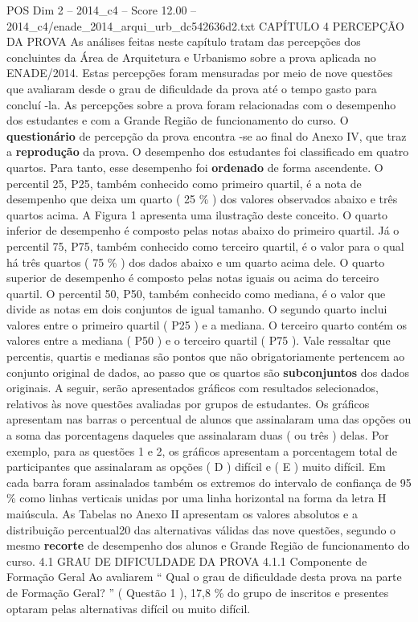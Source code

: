 \begin{textsample}{POS Dim 2 – 2014\_c4 – Score 12.00 – 2014\_c4/enade\_2014\_arqui\_urb\_dc542636d2.txt}  \label{ex:f2_pos_117}
CAPÍTULO 4 PERCEPÇÃO DA PROVA As análises feitas neste capítulo tratam das percepções dos concluintes da Área de Arquitetura e Urbanismo sobre a prova aplicada no ENADE/2014.
Estas percepções foram mensuradas por meio de nove questões que avaliaram desde o grau de dificuldade da prova até o tempo gasto para concluí -la.
As percepções sobre a prova foram relacionadas com o desempenho dos estudantes e com a Grande Região de funcionamento do curso.
O \textbf{questionário} de percepção da prova encontra -se ao final do Anexo IV, que traz a \textbf{reprodução} da prova.
O desempenho dos estudantes foi classificado em quatro quartos.
Para tanto, esse desempenho foi \textbf{ordenado} de forma ascendente.
O percentil 25, P25, também conhecido como primeiro quartil, é a nota de desempenho que deixa um quarto ( 25 \% ) dos valores observados abaixo e três quartos acima.
A Figura 1 apresenta uma ilustração deste conceito.
O quarto inferior de desempenho é composto pelas notas abaixo do primeiro quartil.
Já o percentil 75, P75, também conhecido como terceiro quartil, é o valor para o qual há três quartos ( 75 \% ) dos dados abaixo e um quarto acima dele.
O quarto superior de desempenho é composto pelas notas iguais ou acima do terceiro quartil.
O percentil 50, P50, também conhecido como mediana, é o valor que divide as notas em dois conjuntos de igual tamanho.
O segundo quarto inclui valores entre o primeiro quartil ( P25 ) e a mediana.
O terceiro quarto contém os valores entre a mediana ( P50 ) e o terceiro quartil ( P75 ).
Vale ressaltar que percentis, quartis e medianas são pontos que não obrigatoriamente pertencem ao conjunto original de dados, ao passo que os quartos são \textbf{subconjuntos} dos dados originais.
A seguir, serão apresentados gráficos com resultados selecionados, relativos às nove questões avaliadas por grupos de estudantes.
Os gráficos apresentam nas barras o percentual de alunos que assinalaram uma das opções ou a soma das porcentagens daqueles que assinalaram duas ( ou três ) delas.
Por exemplo, para as questões 1 e 2, os gráficos apresentam a porcentagem total de participantes que assinalaram as opções ( D ) difícil e ( E ) muito difícil.
Em cada barra foram assinalados também os extremos do intervalo de confiança de 95 \% como linhas verticais unidas por uma linha horizontal na forma da letra H maiúscula.
As Tabelas no Anexo II apresentam os valores absolutos e a distribuição percentual20 das alternativas válidas das nove questões, segundo o mesmo \textbf{recorte} de desempenho dos alunos e Grande Região de funcionamento do curso. 4.1 GRAU DE DIFICULDADE DA PROVA 4.1.1 Componente de Formação Geral Ao avaliarem “ Qual o grau de dificuldade desta prova na parte de Formação Geral? ” ( Questão 1 ), 17,8 \% do grupo de inscritos e presentes optaram pelas alternativas difícil ou muito difícil.

\end{textsample}
